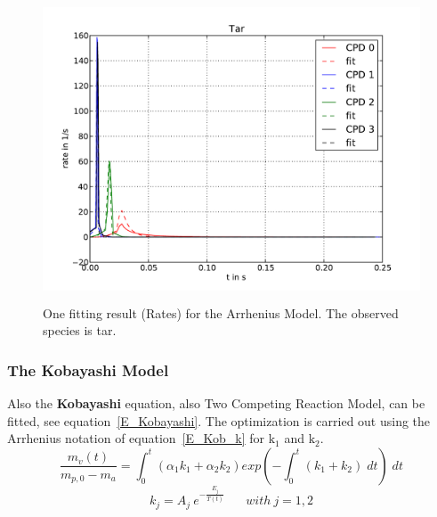 \begin{figure}
\centering%
\includegraphics[height=9cm,angle=0]{Figures/CPD-Fit_result_Arrh_Tar_R}
\caption{One fitting result (Rates) for the Arrhenius Model. The observed species is tar.}
\label{F_Fit_Arrh_R}
\end{figure}

\subsubsection{The Kobayashi Model}\label{SSS_Kob}

Also the \textbf{Kobayashi} equation, also Two Competing Reaction Model, can be fitted, see equation~\ref{E_Kobayashi}. The optimization is carried out using the Arrhenius notation of equation~\ref{E_Kob_k} for $\mathrm{k_1}$ and $\mathrm{k_2}$.
\begin{equation}\label{E_Kobayashi}
 \frac{m_v(t)}{m_{p,0} - m_a}= \int_{0}^{t} ( \alpha_1 k_1 + \alpha_2 k_2 ) exp \left( -  \int_{0}^{t} ( k_1 + k_2 ) \; dt \right) \; dt
\end{equation}
\begin{equation}\label{E_Kob_k}
 k_j=A_j \:e^{-\frac{E_{j}}{T(t)}} \;\;\;\;\;\; with \: j=1,2
\end{equation}

